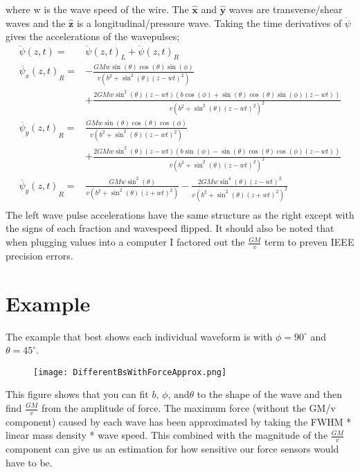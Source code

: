\documentclass{report}
\begin{document}
where w is the wave speed of the wire. The $\mathbf{\hat x}$ and $\mathbf{\hat y}$ waves are transverse/shear waves and the $\mathbf{\hat z}$ is a longitudinal/pressure wave.
Taking the time derivatives of $\dot{\psi}$ gives the accelerations of the wavepulses;
\begin{align}
    \ddot{\psi} (z, t) =& {\ddot{\psi} (z, t)}_L + {\ddot{\psi} (z, t)}_R\\
    \nonumber {\ddot{\psi_x} (z, t)}_R =& -\frac{G M w \sin (\theta ) \cos (\theta ) \sin (\phi )}{v \left(b^2+\sin ^2(\theta ) {(z - w t)}^2\right) }\\
    & +\frac{2 G M w \sin ^2(\theta ) (z - w t) (b \cos (\phi )+\sin (\theta ) \cos (\theta ) \sin (\phi ) (z - w t))}{v {\left(b^2+\sin ^2(\theta ) {(z - w t)}^2\right)}^2}\\
    \nonumber {\ddot{\psi_y} (z, t)}_R =& \frac{G M w \sin (\theta ) \cos (\theta ) \cos (\phi )}{v \left(b^2+\sin ^2(\theta ) {(z - w t)}^2\right)}\\
    & +\frac{2 G M w \sin ^2(\theta ) (z - w t) (b \sin (\phi )-\sin (\theta ) \cos (\theta ) \cos (\phi ) (z - w t))}{v {\left(b^2+\sin ^2(\theta ) {(z - w t)}^2\right)}^2} \\
    \nonumber {\ddot{\psi_y} (z, t)}_R =& \frac{G M w \sin ^2(\theta )}{v \left(b^2+\sin ^2(\theta ) {(z + w t)}^2\right)} - \frac{2 G M w \sin ^4(\theta ) {(z - w t)}^2}{v {\left(b^2+\sin ^2(\theta ) {(z + w t)}^2\right)}^2}\\
\end{align} 
The left wave pulse accelerations have the same structure as the right except with the signs of each fraction and wavespeed flipped.
It should also be noted that when plugging values into a computer I factored out the $\frac{G M}{v}$ term to preven IEEE precision errors.


\section{Example}
The example that best shows each individual waveform is with $\phi = 90^\circ$ and $\theta = 45^\circ$.

\begin{figure}[H]
    \texttt{[image: DifferentBsWithForceApprox.png]}
\end{figure}

This figure shows that you can fit $b \text{, } \phi \text{, and} \theta$ to the shape of the wave and then find $\frac{G M}{v}$ from the amplitude of force.
The maximum force (without the GM/v component) caused by each wave has been approximated by taking the FWHM * linear mass density * wave speed. This combined with 
the magnitude of the $\frac{G M}{v}$ component can give us an estimation for how sensitive our force sensors would have to be.
\end{document}
